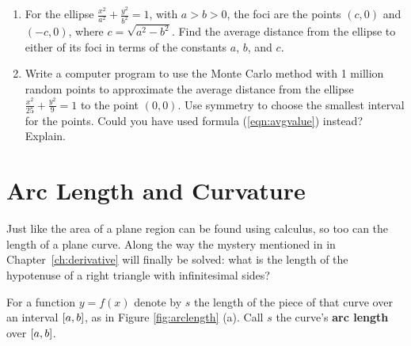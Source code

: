 {\begin{enumerate}[\bfseries 1.]
\begin{enumerate}[\bfseries (a)]
$\ival{0}{2\pi/\Omega}$ of oscillation is
\[
\avg{E_\sigma} ~=~ \frac{1}{2}\nu \Omega^2 R^2 ~.
\]
  \end{enumerate}
[{[\bfseries 1.]}]
 \item For the ellipse $\frac{x^2}{a^2} + \frac{y^2}{b^2} = 1$, with $a > b > 0$,
  the foci are the points $(c,0)$ and $(-c,0)$, where $c = \sqrt{a^2 - b^2}$.
  Find the average distance from the ellipse to either of its foci in terms of
  the constants $a$, $b$, and $c$.
 \item Write a computer program to use the Monte Carlo method with 1 million
  random points to approximate the average distance from the ellipse
  $\frac{x^2}{25} + \frac{y^2}{9} = 1$ to the point $(0,0)$. Use symmetry to
  choose the smallest interval for the points. Could you have used formula
  (\ref{eqn:avgvalue}) instead? Explain.
\end{enumerate}
}
\newpage
\section{Arc Length and Curvature}\label{sec:arc-length-and-curvature}
Just like the area of a plane region can be found using calculus, so too can the
length of a plane curve. Along the way the mystery mentioned in  in
Chapter~\ref{ch:derivative} will finally be solved: what is the length of the hypotenuse of a
right triangle with infinitesimal sides?

For a function $y=f(x)$ denote by $s$ the length of the piece of that curve over
an interval $\lbrack a,b \rbrack$, as in Figure \ref{fig:arclength} (a). Call $s$ the
curve's \textbf{arc length} over $\lbrack a,b \rbrack$. 

